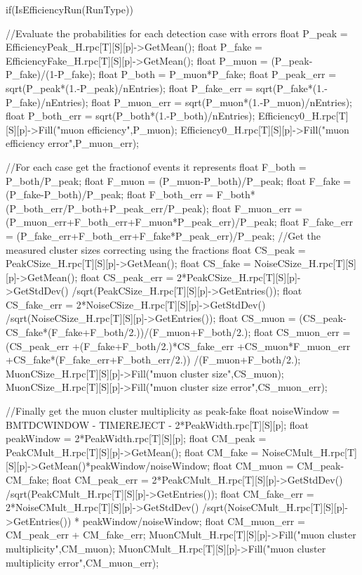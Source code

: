	\begin{code}
	\begin{cppcode}
if(IsEfficiencyRun(RunType)){
    //Evaluate the probabilities for each detection case with errors
    float P_peak = EfficiencyPeak_H.rpc[T][S][p]->GetMean();
    float P_fake = EfficiencyFake_H.rpc[T][S][p]->GetMean();
    float P_muon = (P_peak-P_fake)/(1-P_fake);
    float P_both = P_muon*P_fake;
    float P_peak_err = sqrt(P_peak*(1.-P_peak)/nEntries);
    float P_fake_err = sqrt(P_fake*(1.-P_fake)/nEntries);
    float P_muon_err = sqrt(P_muon*(1.-P_muon)/nEntries);
    float P_both_err = sqrt(P_both*(1.-P_both)/nEntries);
    Efficiency0_H.rpc[T][S][p]->Fill("muon efficiency",P_muon);
    Efficiency0_H.rpc[T][S][p]->Fill("muon efficiency error",P_muon_err);

    //For each case get the fractionof events it represents
    float F_both = P_both/P_peak;
    float F_muon = (P_muon-P_both)/P_peak;
    float F_fake = (P_fake-P_both)/P_peak;
    float F_both_err = F_both*(P_both_err/P_both+P_peak_err/P_peak);
    float F_muon_err = (P_muon_err+F_both_err+F_muon*P_peak_err)/P_peak;
    float F_fake_err = (P_fake_err+F_both_err+F_fake*P_peak_err)/P_peak;
    //Get the measured cluster sizes correcting using the fractions
    float CS_peak = PeakCSize_H.rpc[T][S][p]->GetMean();
    float CS_fake = NoiseCSize_H.rpc[T][S][p]->GetMean();
    float CS_peak_err = 2*PeakCSize_H.rpc[T][S][p]->GetStdDev()
                        /sqrt(PeakCSize_H.rpc[T][S][p]->GetEntries());
    float CS_fake_err = 2*NoiseCSize_H.rpc[T][S][p]->GetStdDev()
                        /sqrt(NoiseCSize_H.rpc[T][S][p]->GetEntries());
    float CS_muon = (CS_peak-CS_fake*(F_fake+F_both/2.))/(F_muon+F_both/2.);
    float CS_muon_err = (CS_peak_err
                         +(F_fake+F_both/2.)*CS_fake_err
                         +CS_muon*F_muon_err
                         +CS_fake*(F_fake_err+F_both_err/2.))
                        /(F_muon+F_both/2.);
    MuonCSize_H.rpc[T][S][p]->Fill("muon cluster size",CS_muon);
    MuonCSize_H.rpc[T][S][p]->Fill("muon cluster size error",CS_muon_err);

    //Finally get the muon cluster multiplicity as peak-fake
    float noiseWindow = BMTDCWINDOW - TIMEREJECT - 2*PeakWidth.rpc[T][S][p];
    float peakWindow = 2*PeakWidth.rpc[T][S][p];
    float CM_peak = PeakCMult_H.rpc[T][S][p]->GetMean();
    float CM_fake = NoiseCMult_H.rpc[T][S][p]->GetMean()*peakWindow/noiseWindow;
    float CM_muon = CM_peak-CM_fake;
    float CM_peak_err = 2*PeakCMult_H.rpc[T][S][p]->GetStdDev()
                        /sqrt(PeakCMult_H.rpc[T][S][p]->GetEntries());
    float CM_fake_err = 2*NoiseCMult_H.rpc[T][S][p]->GetStdDev()
                        /sqrt(NoiseCMult_H.rpc[T][S][p]->GetEntries())
                        * peakWindow/noiseWindow;
    float CM_muon_err = CM_peak_err + CM_fake_err;
    MuonCMult_H.rpc[T][S][p]->Fill("muon cluster multiplicity",CM_muon);
    MuonCMult_H.rpc[T][S][p]->Fill("muon cluster multiplicity error",CM_muon_err);

}
\end{cppcode}
\end{code}
